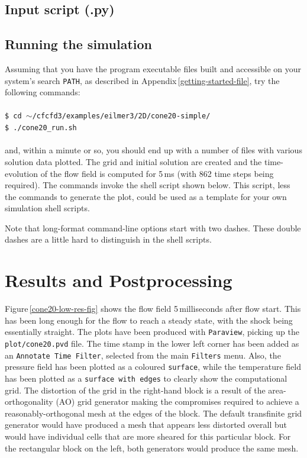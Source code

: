 \subsection{Input script (.py)}
%

\noindent\topbar

\bottombar


\subsection{Running the simulation}
%
Assuming that you have the program executable files built and
accessible on your system's search \texttt{PATH}, as described in Appendix\,\ref{getting-started-file},
try the following commands:\\
%
\topbar\\
\texttt{\$ cd $\sim$/cfcfd3/examples/eilmer3/2D/cone20-simple/}\\
\texttt{\$ ./cone20\_run.sh}\\
\bottombar\\
%
and, within a minute or so, you should end up with a number of files
with various solution data plotted.
The grid and initial solution are created and the time-evolution of the
flow field is computed for 5\,ms (with 862 time steps being required).
The commands invoke the shell script shown below.
This script, less the commands to generate the plot, could be used as
a template for your own simulation shell scripts.

\noindent \topbar

\bottombar

\noindent
Note that long-format command-line options start with two dashes.
These double dashes are a little hard to distinguish in the shell scripts.
      
      
\section{Results and Postprocessing}
%
Figure\,\ref{cone20-low-res-fig} shows the flow field 5\,milliseconds after flow start.
This has been long enough for the flow to reach a steady state, with the shock being essentially straight.
The plots have been produced with \verb!Paraview!, picking up the \verb!plot/cone20.pvd! file.
The time stamp in the lower left corner has been added as an \verb!Annotate Time Filter!, 
selected from the main \verb!Filters! menu.
Also, the pressure field has been plotted as a coloured \verb!surface!, 
while the temperature field has been plotted as a \verb!surface with edges!
to clearly show the computational grid.
The distortion of the grid in the right-hand block is a result of the area-orthogonality (AO) grid generator
making the compromises required to achieve a reasonably-orthogonal mesh at the edges of the block.
The default transfinite grid generator would have produced a mesh that appears less distorted
overall but would have individual cells that are more sheared for this particular block.
For the rectangular block on the left, both generators would produce the same mesh.

